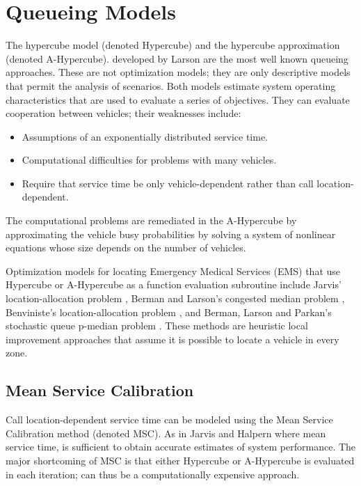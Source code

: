 \section{Queueing Models}
The hypercube model (denoted Hypercube)
and the hypercube approximation (denoted A-Hypercube).
developed by Larson  \cite{larson1974hypercube,larson1975approximating}
are the most well known queueing approaches.
These are not optimization models;
they are only descriptive models
that permit the analysis of scenarios.
Both models
estimate system operating characteristics
that are used to evaluate a series of objectives.
They can evaluate cooperation between vehicles;
their weaknesses include:
\begin{itemize}
\item Assumptions of an exponentially distributed service time.
\item Computational difficulties for problems with many vehicles.
\item Require that service time be only vehicle-dependent
  rather than call location-dependent.
\end{itemize}

The computational problems are remediated in the A-Hypercube
by approximating the vehicle busy probabilities
by solving a system of nonlinear equations
whose size depends on the number of vehicles.

Optimization models for locating Emergency Medical Services (EMS)
that use Hypercube or A-Hypercube as a function evaluation subroutine
include Jarvis' location-allocation problem \cite{jarvis1975optimization},
Berman and Larson's congested median problem \cite{berman1982median},
Benviniste's location-allocation problem \cite{benveniste1985solving},
and Berman, Larson and Parkan's
stochastic queue p-median problem \cite{berman1987stochastic}.
These methods are heuristic local improvement approaches
that assume it is possible to locate a vehicle in every zone.

\subsection{Mean Service Calibration}
Call location-dependent service time
can be modeled using the Mean Service Calibration method (denoted MSC).
As in Jarvis \cite{jarvis1975optimization} 
and Halpern \cite{halpern1977accuracy}
where mean service time,
is sufficient to obtain accurate estimates of system performance.
The major shortcoming of MSC is that either
Hypercube or A-Hypercube
is evaluated in each iteration;
can thus be a computationally expensive approach.

